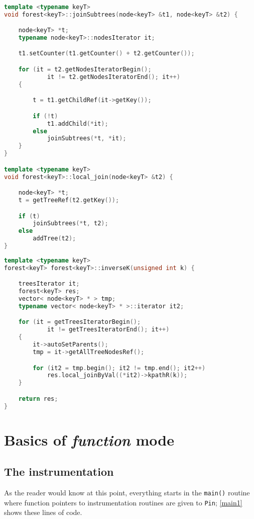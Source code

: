 \documentclass[a4paper,10pt]{report}
\begin{document}
\begin{lstlisting}[language=C++,
	caption={the implementation of the $join$ operation},
	label=joinop, frame=leftline]

template <typename keyT>
void forest<keyT>::joinSubtrees(node<keyT> &t1, node<keyT> &t2) {

	node<keyT> *t;
	typename node<keyT>::nodesIterator it;

	t1.setCounter(t1.getCounter() + t2.getCounter());

	for (it = t2.getNodesIteratorBegin();
			it != t2.getNodesIteratorEnd(); it++)
	{

		t = t1.getChildRef(it->getKey());

		if (!t)
			t1.addChild(*it);
		else
			joinSubtrees(*t, *it);
	}
}

template <typename keyT>
void forest<keyT>::local_join(node<keyT> &t2) {

	node<keyT> *t;
	t = getTreeRef(t2.getKey());

	if (t)
		joinSubtrees(*t, t2);
	else
		addTree(t2);
}

\end{lstlisting}

\begin{lstlisting}[language=C++,
	caption={the implementation of the $inv_k$ operation},
	label=invk, frame=leftline]
template <typename keyT>
forest<keyT> forest<keyT>::inverseK(unsigned int k) {

	treesIterator it;
	forest<keyT> res;
	vector< node<keyT> * > tmp;
	typename vector< node<keyT> * >::iterator it2;

	for (it = getTreesIteratorBegin();
			it != getTreesIteratorEnd(); it++)
	{
		it->autoSetParents();
		tmp = it->getAllTreeNodesRef();

		for (it2 = tmp.begin(); it2 != tmp.end(); it2++)
			res.local_joinByVal((*it2)->kpathR(k));
	}

	return res;
}
\end{lstlisting}

\section{Basics of \emph{function} mode}

\subsection{The instrumentation}

As the reader would know at this point, everything starts in the \verb|main()| routine
where function pointers to instrumentation routines are given to \texttt{Pin};
\cref{main1} shows these lines of code.
\end{document}
